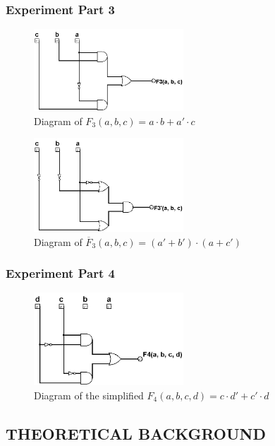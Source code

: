 \documentclass[pdftex,12pt,a4paper]{article}
\begin{document}
\subsubsection{Experiment Part 3}
\begin{figure}[H]
	\centering
	\includegraphics[width=0.5\textwidth]{f3_diagram.png}	
	\caption{Diagram of \(F_3(a, b, c) = a \cdot b + a' \cdot c\)}
	\label{fig4}
\end{figure}

\begin{figure}[H]
	\centering
	\includegraphics[width=0.5\textwidth]{f3_complement_diagram.png}	
	\caption{Diagram of \(\overline{F}_3(a, b, c) = (a' + b') \cdot (a + c')\)}
	\label{fig5}
\end{figure}

\subsubsection{Experiment Part 4}
\begin{figure}[H]
	\centering
	\includegraphics[width=0.5\textwidth]{f4_diagram.png}	
	\caption{Diagram of the simplified \(F_4(a, b, c, d) = c \cdot d' + c' \cdot d\)}
	\label{fig6}
\end{figure}

\subsection{THEORETICAL BACKGROUND}
\end{document}
